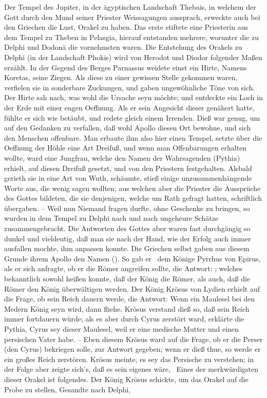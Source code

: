 \begin{aufza}
\item Der Tempel des Jupiter, in der ägyptischen Landschaft Thebais, in welchem der Gott durch den Mund seiner Priester Weissagungen aussprach, erweckte auch bei den Griechen die Lust, Orakel zu haben. Das erste stiftete eine Priesterin aus dem Tempel zu Theben in Pelasgia, hierauf entstanden mehrere, worunter die zu Delphi und Dodonä die vornehmsten waren. Die Entstehung des Orakels zu Delphi (in der Landschaft Phokis) wird von Herodot und Diodor folgender Maßen erzählt. In der Gegend des Berges Parnassus weidete einst ein Hirte, Namens Koretas, seine Ziegen. Als diese zu einer gewissen Stelle gekommen waren, verfielen sie in sonderbare Zuckungen, und gaben ungewöhnliche Töne von sich. Der Hirte sah nach, was wohl die Ursache seyn möchte; und entdeckte ein Loch in der Erde mit einer engen Oeffnung. Als er sein Angesicht dieser genähert hatte, fühlte er sich wie betäubt, und redete gleich einem Irrenden. Dieß war genug, um auf den Gedanken zu verfallen, daß wohl Apollo diesen Ort bewohne, und sich den Menschen offenbare. Man erbaute ihm also hier einen Tempel, setzte über die Oeffnung der Höhle eine Art Dreifuß, und wenn man Offenbarungen erhalten wollte, ward eine Jungfrau, welche den Namen der Wahrsagenden (Pythia) erhielt, auf diesen Dreifuß gesetzt, und von den Priestern festgehalten. Alsbald gerieth sie in eine Art von Wuth, schäumte, stieß einige unzusammenhängende Worte aus, die wenig sagen wollten; aus welchen aber die Priester die Aussprüche des Gottes bildeten, die sie denjenigen, welche um Rath gefragt hatten, schriftlich übergaben. -- Weil nun Niemand fragen durfte, ohne Geschenke zu bringen, so wurden in dem Tempel zu Delphi nach und nach ungeheure Schätze zusammengebracht. Die Antworten des Gottes aber waren fast durchgängig so dunkel und vieldeutig, daß man sie nach der Hand, wie der Erfolg auch immer ausfallen mochte, ihm anpassen konnte. Die Griechen selbst gaben aus diesem Grunde ihrem Apollo den Namen  (). So gab er \zB\ dem Könige Pyrrhus von Epirus, als er sich anfragte, ob er die Römer angreifen sollte, die Antwort: ; welches bekanntlich sowohl heißen konnte, daß der König die Römer, als auch, daß die Römer den König überwältigen werden. Der König Krösus von Lydien erhielt auf die Frage, ob sein Reich dauern werde, die Antwort: Wenn ein Maulesel bei den Medern König seyn wird, dann fliehe. Krösus verstand dieß so, daß sein Reich immer fortdauern würde; als es aber durch Cyrus zerstört ward, erklärte die Pythia, Cyrus sey dieser Maulesel, weil er eine medische Mutter und einen persischen Vater habe. -- Eben diesem Krösus ward auf die Frage, ob er die Perser (den Cyrus) bekriegen solle, zur Antwort gegeben; wenn er dieß thue, so werde er ein großes Reich zerstören. Krösus meinte, es sey das Persische zu verstehen; in der Folge aber zeigte sich's, daß es sein eigenes wäre, \usw\ Eines der merkwürdigsten dieser Orakel ist folgendes. Der König Krösus schickte, um das Orakel auf die Probe zu stellen, Gesandte nach Delphi, 
\end{aufza}
